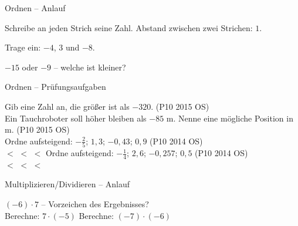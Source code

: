 \setcounter{aufgabe}{38}

\begin{aufgabe}{Ordnen – Anlauf}
\begin{teile}
\teil Schreibe an jeden Strich seine Zahl. Abstand zwischen zwei Strichen: $1$.

\teil Trage ein: $-4$, $3$ und $-8$.

\zahlenstrahl[xmin=-10,xmax=10,xstep=1]{}
\teil $-15$ oder $-9$ – welche ist kleiner? \leerfeld
\end{teile}
\end{aufgabe}

\begin{aufgabe}{Ordnen – Prüfungsaufgaben}
\begin{teile}
\teil Gib eine Zahl an, die größer ist als $-320$. \hfill (P10 2015 OS) \\ \leerfeld
\teil Ein Tauchroboter soll höher bleiben als $-85$ m. Nenne eine mögliche Position in m. \hfill (P10 2015 OS) \\ \leerfeld[m]
\teil Ordne aufsteigend: $-\frac{2}{5}$; $1{,}3$; $-0{,}43$; $0{,}9$ \hfill (P10 2014 OS) \\ \leerfeld $<$ \leerfeld $<$ \leerfeld $<$ \leerfeld
\teil Ordne aufsteigend: $-\frac{1}{4}$; $2{,}6$; $-0{,}257$; $0{,}5$ \hfill (P10 2014 OS) \\ \leerfeld $<$ \leerfeld $<$ \leerfeld $<$ \leerfeld
\end{teile}
\end{aufgabe}

\begin{aufgabe}{Multiplizieren/Dividieren – Anlauf}
\begin{teile}
\teil $(-6) \cdot 7$ – Vorzeichen des Ergebnisses?\\  
\teil Berechne: $7 \cdot (-5)$ \leerfeld
\teil Berechne: $(-7) \cdot (-6)$ \leerfeld
\end{teile}
\end{aufgabe}

